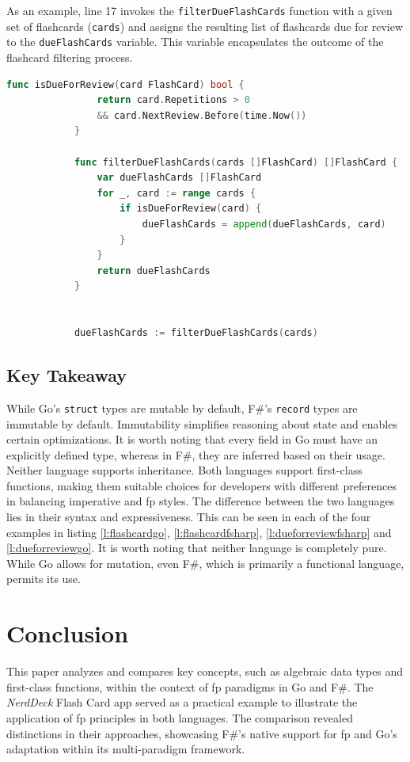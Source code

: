     As an example, line 17 invokes the \texttt{filterDueFlashCards} function with a given set of flashcards (\texttt{cards}) and assigns the resulting list of flashcards due for review to the \texttt{dueFlashCards} variable. This variable encapsulates the outcome of the flashcard filtering process.

        \begin{lstlisting}[language=go, firstnumber=1, caption={FlashCard representation in F\#}, label=l:dueforreviewgo]
            func isDueForReview(card FlashCard) bool {
                return card.Repetitions > 0 
                && card.NextReview.Before(time.Now())
            }
            
            func filterDueFlashCards(cards []FlashCard) []FlashCard {
                var dueFlashCards []FlashCard
                for _, card := range cards {
                    if isDueForReview(card) {
                        dueFlashCards = append(dueFlashCards, card)
                    }
                }
                return dueFlashCards
            }
            
    
            dueFlashCards := filterDueFlashCards(cards)
            \end{lstlisting}
            

    \section{Key Takeaway}\label{sec:keytakeaway}
    While Go's \texttt{struct} types are mutable by default, F\#'s \texttt{record} types are immutable by default. Immutability simplifies reasoning about state and enables certain optimizations. It is worth noting that every field in Go must have an explicitly defined type, whereas in F\#, they are inferred based on their usage. Neither language supports inheritance. Both languages support first-class functions, making them suitable choices for developers with different preferences in balancing imperative and \ac{fp} styles. The difference between the two languages lies in their syntax and expressiveness. This can be seen in each of the four examples in listing \ref{l:flashcardgo}, \ref{l:flashcardfsharp}, \ref{l:dueforreviewfsharp} and \ref{l:dueforreviewgo}.
 It is worth noting that neither language is completely pure. While Go allows for mutation, even F\#, which is primarily a functional language, permits its use.


\chapter{Conclusion}\label{chap:conclusion}
This paper analyzes and compares key concepts, such as algebraic data types and first-class functions, within the context of \ac{fp} paradigms in Go and F\#. The \textit{NerdDeck} Flash Card \ac{app} served as a practical example to illustrate the application of \ac{fp} principles in both languages. The comparison revealed distinctions in their approaches, showcasing F\#'s native support for \ac{fp} and Go's adaptation within its multi-paradigm framework.
